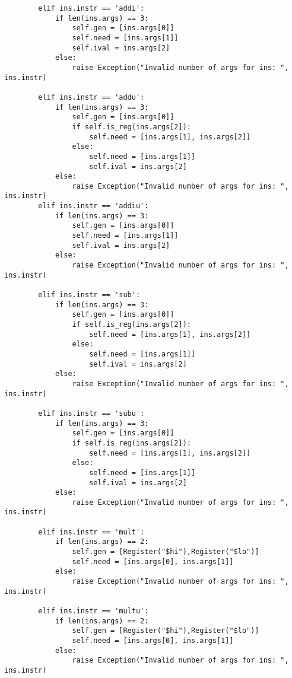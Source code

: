 \begin{lstlisting}
        elif ins.instr == 'addi': 
            if len(ins.args) == 3:
                self.gen = [ins.args[0]]
                self.need = [ins.args[1]]
                self.ival = ins.args[2]
            else:
                raise Exception("Invalid number of args for ins: ", ins.instr)           
        
        elif ins.instr == 'addu': 
            if len(ins.args) == 3:
                self.gen = [ins.args[0]]
                if self.is_reg(ins.args[2]):
                    self.need = [ins.args[1], ins.args[2]]
                else: 
                    self.need = [ins.args[1]]
                    self.ival = ins.args[2]
            else:
                raise Exception("Invalid number of args for ins: ", ins.instr)           
        elif ins.instr == 'addiu':
            if len(ins.args) == 3:
                self.gen = [ins.args[0]]
                self.need = [ins.args[1]]
                self.ival = ins.args[2]
            else:
                raise Exception("Invalid number of args for ins: ", ins.instr)   
                        
        elif ins.instr == 'sub': 
            if len(ins.args) == 3:
                self.gen = [ins.args[0]]
                if self.is_reg(ins.args[2]):
                    self.need = [ins.args[1], ins.args[2]]
                else: 
                    self.need = [ins.args[1]]
                    self.ival = ins.args[2]
            else:
                raise Exception("Invalid number of args for ins: ", ins.instr)  
                         
        elif ins.instr == 'subu': 
            if len(ins.args) == 3:
                self.gen = [ins.args[0]]
                if self.is_reg(ins.args[2]):
                    self.need = [ins.args[1], ins.args[2]]
                else: 
                    self.need = [ins.args[1]]
                    self.ival = ins.args[2]
            else:
                raise Exception("Invalid number of args for ins: ", ins.instr)  
                        
        elif ins.instr == 'mult': 
            if len(ins.args) == 2:
                self.gen = [Register("$hi"),Register("$lo")]
                self.need = [ins.args[0], ins.args[1]]
            else:
                raise Exception("Invalid number of args for ins: ", ins.instr)   
                      
        elif ins.instr == 'multu':
            if len(ins.args) == 2:
                self.gen = [Register("$hi"),Register("$lo")]
                self.need = [ins.args[0], ins.args[1]]
            else:
                raise Exception("Invalid number of args for ins: ", ins.instr)   
                        

\end{lstlisting}
